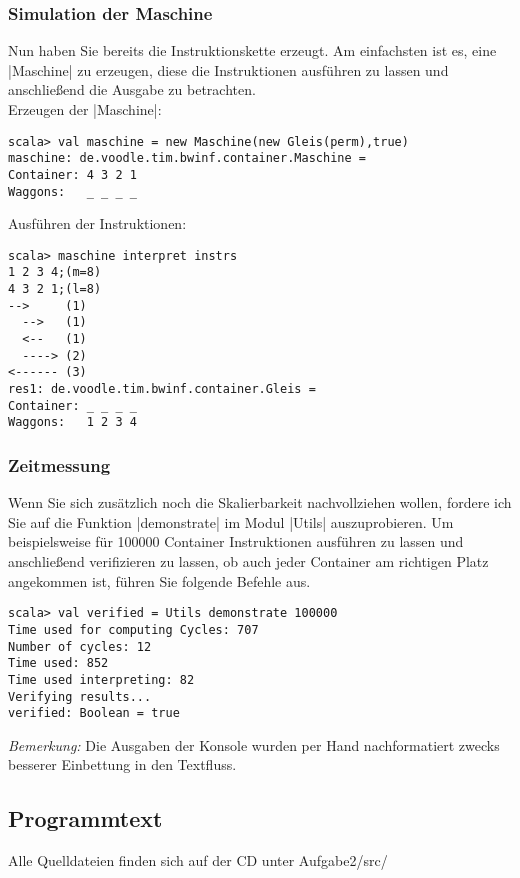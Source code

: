 \subsubsection{Simulation der Maschine}
Nun haben Sie bereits die Instruktionskette erzeugt.
Am einfachsten ist es, eine |Maschine| zu erzeugen, diese die Instruktionen ausführen zu lassen und anschließend die Ausgabe zu betrachten. \\
Erzeugen der |Maschine|:
\begin{lstlisting}
scala> val maschine = new Maschine(new Gleis(perm),true)
maschine: de.voodle.tim.bwinf.container.Maschine = 
Container: 4 3 2 1
Waggons:   _ _ _ _
\end{lstlisting}
Ausführen der Instruktionen:
\begin{lstlisting}
scala> maschine interpret instrs
1 2 3 4;(m=8)
4 3 2 1;(l=8)
-->     (1)
  -->   (1)
  <--   (1)
  ----> (2)
<------ (3)
res1: de.voodle.tim.bwinf.container.Gleis = 
Container: _ _ _ _
Waggons:   1 2 3 4
\end{lstlisting}
\subsubsection{Zeitmessung}
Wenn Sie sich zusätzlich noch die Skalierbarkeit nachvollziehen wollen, fordere ich Sie auf die Funktion |demonstrate| im Modul |Utils| auszuprobieren.
Um beispielsweise für 100000 Container Instruktionen ausführen zu lassen und anschließend verifizieren zu lassen, ob auch jeder Container am richtigen Platz angekommen ist, führen Sie folgende Befehle aus.
\begin{lstlisting}
scala> val verified = Utils demonstrate 100000 
Time used for computing Cycles: 707
Number of cycles: 12
Time used: 852
Time used interpreting: 82
Verifying results...
verified: Boolean = true
\end{lstlisting}

\begin{flushright}
\begin{footnotesize}
\emph{Bemerkung:} Die Ausgaben der Konsole wurden per Hand nachformatiert zwecks besserer Einbettung in den Textfluss.
\end{footnotesize}
\end{flushright}

\newpage
\subsection{Programmtext}
Alle Quelldateien finden sich auf der CD unter Aufgabe2/src/
